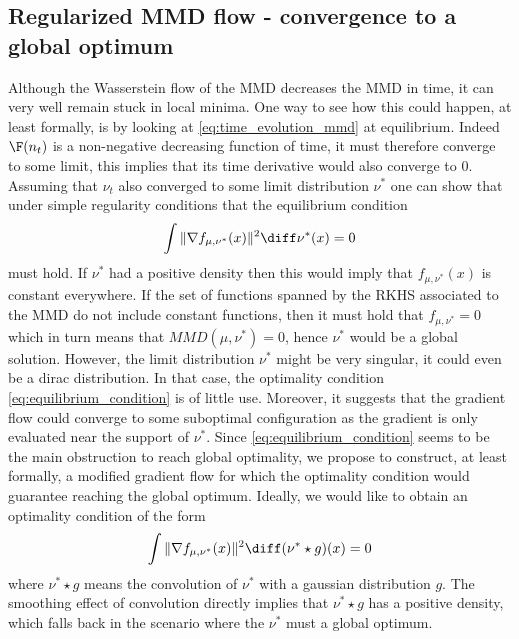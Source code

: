 \subsection{Regularized MMD flow - convergence to a global optimum}

Although the Wasserstein flow of the MMD decreases the MMD in time, it can very well remain stuck in local minima. One way to see how this could happen, at least formally, is by looking at \cref{eq:time_evolution_mmd} at equilibrium. Indeed $\F(n_t)$ is a non-negative decreasing function of time, it must therefore converge to some limit, this implies that its time derivative would also converge to $0$. Assuming that $\nu_t$ also converged to some limit distribution $\nu^{*}$ one can show that under simple regularity conditions that the equilibrium condition
\begin{align}\label{eq:equilibrium_condition}
	\int \Vert \nabla f_{\mu,\nu^{*}}(x)\Vert^2 \diff \nu^{*}(x) =0  
\end{align} 
must hold. If $\nu^*$ had a positive density then this would imply that $f_{\mu,\nu^{*}}(x)$ is constant everywhere. If the set of functions spanned by the RKHS associated to the MMD do not include constant functions, then it must hold that $f_{\mu,\nu^{*}}=0$ which in turn means that $MMD(\mu,\nu^{*})=0$, hence $\nu^*$ would be a global solution. However, the limit distribution $\nu^*$  might be very singular, it could even be a dirac distribution. In that case, the optimality condition \cref{eq:equilibrium_condition} is of little use. Moreover, it suggests that the gradient flow could converge to some suboptimal configuration as the gradient is only evaluated near the support of $\nu^*$.
Since \cref{eq:equilibrium_condition} seems to be the main obstruction to reach global optimality, we propose to construct, at least formally, a modified gradient flow for which the optimality condition would guarantee reaching the global optimum.
Ideally, we would like to obtain an optimality condition of the form
\begin{align}\label{eq:soothed_equilibrium_condition}
	\int \Vert \nabla f_{\mu,\nu^{*}}(x)\Vert^2 \diff (\nu^{*}\star g)(x) =0  
\end{align}
where $\nu^{*}\star g$ means the convolution of $\nu^*$ with a gaussian distribution $g$. The smoothing effect of convolution directly implies that $\nu^{*}\star g$ has a positive density, which falls back in the scenario where the $\nu^*$ must a global optimum.
